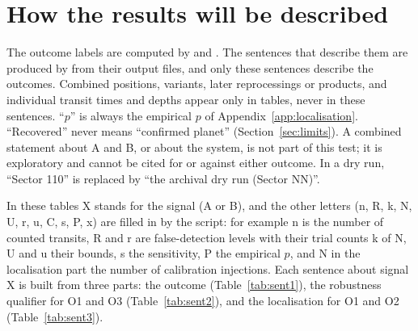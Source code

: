 \section{How the results will be described} \label{app:wording}

The outcome labels are computed by  and . The sentences that describe them
are produced by  from their output files, and only these sentences describe the outcomes.
Combined positions, variants, later reprocessings or products, and individual transit times and depths appear only in
tables, never in these sentences. ``$p$'' is always the empirical $p$ of Appendix~\ref{app:localisation}.
``Recovered'' never means ``confirmed planet'' (Section~\ref{sec:limits}). A combined statement about A and B, or about
the system, is not part of this test; it is exploratory and cannot be cited for or against either outcome. In a dry
run, ``Sector 110'' is replaced by ``the archival dry run (Sector NN)''.

In these tables X stands for the signal (A or B), and the other letters (n, R, k, N, U, r, u, C, s, P, x) are filled in
by the script: for example n is the number of counted transits, R and r are false-detection levels with their trial
counts k of N, U and u their bounds, s the sensitivity, P the empirical $p$, and N in the localisation part the number of
calibration injections. Each sentence about signal X is built from three parts: the outcome (Table~\ref{tab:sent1}), the robustness
qualifier for O1 and O3 (Table~\ref{tab:sent2}), and the localisation for O1 and O2 (Table~\ref{tab:sent3}).

